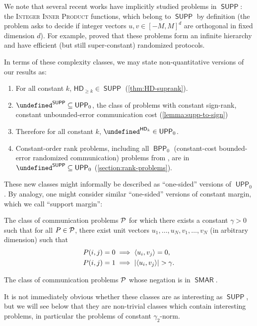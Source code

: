 \documentclass[conference]{IEEEtran}
\newcommand{\cplxclass}[1]{\mathsf{#1}}
\let\P\undefined\DeclareMathOperator{\P}{\cplxclass{P}}
\DeclareMathOperator{\BPP}{\cplxclass{BPP}}
\DeclareMathOperator{\UPP}{\cplxclass{UPP}}
\DeclareMathOperator{\SUPP}{\cplxclass{SUPP}}
\DeclareMathOperator{\SMAR}{\cplxclass{SMAR}}
\DeclareMathOperator{\coSMAR}{\cplxclass{coSMAR}}
\newcommand{\HD}[1]{\mathsf{HD}_{#1}}
\begin{document}
\noindent
We note that several recent works \cite{CLV19,CHHS23,CHHNPS25,Tom25} have implicitly studied problems
in $\SUPP$: the \textsc{Integer Inner Product} functions, which belong to $\SUPP$ by definition (the
problem asks to decide if integer vectors $u, v \in [-M,M]^d$ are orthogonal in fixed dimension
$d$). For example, \cite{CLV19} proved that these problems form an infinite hierarchy and have
efficient (but still super-constant) randomized protocols.

In terms of these complexity classes, we may state non-quantitative versions of our results as:
\begin{enumerate}
    \item For all constant $k$, $\HD{\geq k} \in \SUPP$ (\cref{thm:HD-suprank}).
    \item $\P^{\SUPP} \subseteq \UPP_0$, the class of problems with constant sign-rank,
    \ie constant unbounded-error communication cost (\cref{lemma:supp-to-sign})
    \item Therefore for all constant $k$, $\P^{\HD{k}} \in \UPP_0$.
    \item Constant-order rank problems, including all $\BPP_0$ (constant-cost bounded-error randomized communication) problems from \cite{FGHH25}, are in $\P^{\SUPP} \subseteq \UPP_0$ (\cref{section:rank-problems}).
\end{enumerate}

These new classes might informally be described as ``one-sided'' versions of $\UPP_0$.
By analogy, one might consider similar ``one-sided'' versions of constant margin,
which we call ``support margin'':

\begin{description}[leftmargin=!,labelwidth=1.4cm,labelsep=0.5em]
    \item[$\SMAR$:]
    The class of communication problems $\mathcal{P}$ for which there exists a constant $\gamma > 0$
    such that for all $P \in \mathcal{P}$, there exist unit vectors $u_1, \dotsc, u_N, v_1, \dotsc, v_N$
    (in arbitrary dimension) such that
    \begin{equation}
    \label{eq:def-smar}
    \begin{aligned}
        P(i,j) = 0 &\implies \langle u_i, v_j \rangle = 0, \\
        P(i,j) = 1 &\implies |\langle u_i, v_j \rangle| > \gamma .
    \end{aligned}
    \end{equation}
    \item[$\coSMAR$:]
    The class of communication problems $\mathcal{P}$ whose negation is in $\SMAR$.
\end{description}
\noindent
It is not immediately obvious whether these classes are as interesting as $\SUPP$,
but we will see below that they are non-trivial classes which contain interesting problems,
in particular the problems of constant $\gamma_2$-norm.
\end{document}
